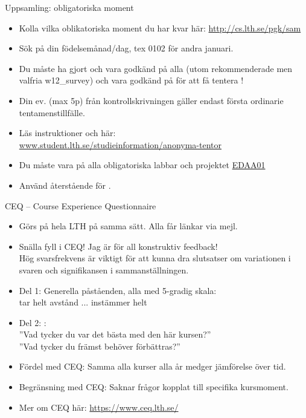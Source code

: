 

\ifkompendium\else

\begin{Slide}{Uppsamling: obligatoriska moment}\SlideFontSmall
\begin{itemize}
\item Kolla vilka oblikatoriska moment du har kvar här:
\url{http://cs.lth.se/pgk/sam}
\item Sök på din födelsemånad/dag, tex 0102 för andra januari.
\item Du måste ha gjort  och vara godkänd på alla  (utom rekommenderade men valfria w12\_survey) och vara godkänd på  för att få tentera !
\item Din ev.  (max 5p) från kontrollskrivningen gäller endast första ordinarie tentamenstillfälle.
\item Läs  instruktioner  och  här: \\
\href{http://www.student.lth.se/studieinformation/anonyma-tentor/}{www.student.lth.se/studieinformation/anonyma-tentor}
\item Du måste vara  på alla obligatoriska labbar och projektet  \href{http://cs.lth.se/edaa01vt}{EDAA01}
\item Använd återstående  för .
\end{itemize}
\end{Slide}

\begin{Slide}{CEQ -- Course Experience Questionnaire}\SlideFontSmall
\begin{itemize}
\item Görs på hela LTH på samma sätt. Alla får länkar via mejl.
\item Snälla fyll i CEQ! Jag är  för all konstruktiv feedback! \\ Hög svarsfrekvens är viktigt för att kunna dra slutsatser om variationen i svaren och signifikansen i sammanställningen.
\item Del 1: Generella påståenden, alla med 5-gradig skala: \\ tar helt avstånd ... instämmer helt
\item Del 2: : \\
''Vad  tycker  du  var  det  bästa  med  den här  kursen?'' \\
''Vad  tycker  du  främst  behöver  förbättras?''
\item Fördel med CEQ: Samma alla kurser alla år medger jämförelse över tid.
\item Begränsning med CEQ: Saknar frågor kopplat till specifika kursmoment.
\item Mer om CEQ här: \url{https://www.ceq.lth.se/}
\end{itemize}
\end{Slide}

